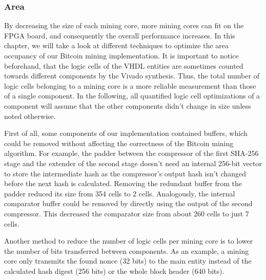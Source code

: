 


\subsubsection{Area}
\label{size}


By decreasing the size of each mining core, more mining cores can fit on the FPGA board, and consequently the overall performance increases. In this chapter, we will take a look at different techniques to optimize the area occupancy of our Bitcoin mining implementation. It is important to notice beforehand, that the logic cells of the VHDL entities are sometimes counted towards different components by the Vivado synthesis. Thus, the total number of logic cells belonging to a mining core is a more reliable measurement than those of a single component. In the following, all quantified logic cell optimizations of a component will assume that the other components didn't change in size unless noted otherwise.

First of all, some components of our implementation contained buffers, which could be removed without affecting the correctness of the Bitcoin mining algorithm. For example, the padder between the compressor of the first SHA-256 stage and the extender of the second stage doesn't need an internal 256-bit vector to store the intermediate hash as the compressor's output hash isn't changed before the next hash is calculated. Removing the redundant buffer from the padder reduced its size from 354 cells to 2 cells. Analogously, the internal comparator buffer could be removed by directly using the output of the second compressor. This decreased the comparator size from about 260 cells to just 7 cells.

Another method to reduce the number of logic cells per mining core is to lower the number of bits transferred between components. As an example, a mining core  only transmits the found nonce (32 bits) to the main entity instead of the calculated hash digest (256 bits) or the whole block header (640 bits).

